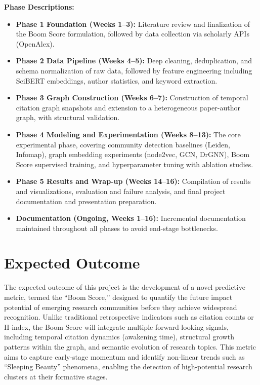 \documentclass[a4paper,12pt]{article}
\begin{document}
\noindent\textbf{Phase Descriptions:}
\vspace{-25pt}
\begin{itemize}
    \item \textbf{Phase 1 Foundation (Weeks 1--3):} Literature review and finalization 
    of the Boom Score formulation, followed by data collection via scholarly APIs 
    (OpenAlex).
    \vspace{-10pt}
    \item \textbf{Phase 2 Data Pipeline (Weeks 4--5):} Deep cleaning, deduplication, 
    and schema normalization of raw data, followed by feature engineering including 
    SciBERT embeddings, author statistics, and keyword extraction.
    \vspace{-10pt}
    \item \textbf{Phase 3 Graph Construction (Weeks 6--7):} Construction of temporal 
    citation graph snapshots and extension to a heterogeneous paper-author graph, 
    with structural validation.
    \vspace{-10pt}
    \item \textbf{Phase 4 Modeling and Experimentation (Weeks 8--13):} The core 
    experimental phase, covering community detection baselines (Leiden, Infomap), 
    graph embedding experiments (node2vec, GCN, DrGNN), Boom Score supervised training, 
    and hyperparameter tuning with ablation studies.
    \vspace{-10pt}
    \item \textbf{Phase 5 Results and Wrap-up (Weeks 14--16):} Compilation of results 
    and visualizations, evaluation and failure analysis, and final project documentation 
    and presentation preparation.
    \vspace{-10pt}
    \item \textbf{Documentation (Ongoing, Weeks 1--16):} Incremental documentation 
    maintained throughout all phases to avoid end-stage bottlenecks.
\end{itemize}

\newpage\section{Expected Outcome}
The expected outcome of this project is the development of a novel predictive metric, 
termed the “Boom Score,” designed to quantify the future impact potential of emerging 
research communities before they achieve widespread recognition. Unlike traditional 
retrospective indicators such as citation counts or H-index, the Boom Score will integrate 
multiple forward-looking signals, including temporal citation dynamics (awakening time), 
structural growth patterns within the graph, and semantic evolution of research topics. 
This metric aims to capture early-stage momentum and identify non-linear trends such as 
“Sleeping Beauty” phenomena, enabling the detection of high-potential research clusters 
at their formative stages.
\end{document}
